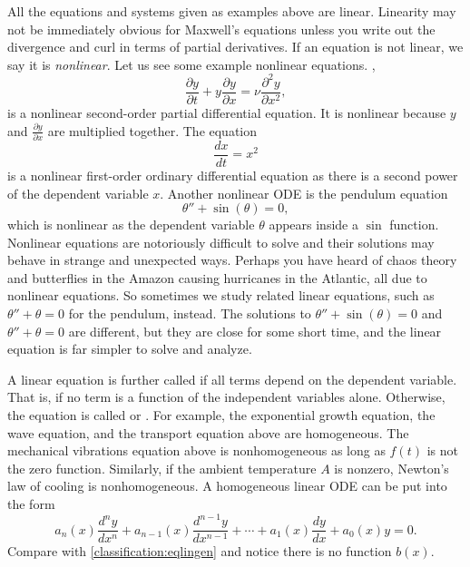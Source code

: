 All the equations and systems given as examples above are linear.
Linearity may not be immediately obvious for Maxwell's equations unless you write out
the divergence and curl in terms of partial derivatives.
If an equation is not linear, we say it is
\emph{nonlinear}.
Let us see some
example nonlinear equations.  ,
\begin{equation*}
\frac{\partial y}{\partial t} +
y \frac{\partial y}{\partial x} =
\nu \frac{\partial^2 y}{\partial x^2} ,
\end{equation*}
is a nonlinear second-order partial differential equation.  It is nonlinear
because $y$ and $\frac{\partial y}{\partial x}$ are multiplied together.
The equation
\begin{equation} \label{classification:eqnonlinode}
\frac{dx}{dt} = x^2
\end{equation}
is a nonlinear first-order ordinary differential equation as there is a second power of
the dependent variable $x$.  Another nonlinear ODE is the pendulum equation
\begin{equation} \label{classification:pendulum}
\theta''+\sin(\theta)=0 ,
\end{equation}
which is nonlinear as the dependent
variable $\theta$ appears inside a $\sin$ function.
Nonlinear equations are notoriously difficult to solve and
their solutions may behave in strange and unexpected ways.
Perhaps you have heard of chaos theory and butterflies
in the Amazon causing hurricanes in the Atlantic, all due to nonlinear
equations.
So sometimes we
study related linear equations, such as $\theta''+\theta=0$ for the pendulum, instead.
The solutions to $\theta''+\sin(\theta) = 0$ and
$\theta''+\theta=0$ are different, but they are
close for some short time, and the linear equation
is far simpler to solve and analyze.

\medskip

A linear equation is further called \emph{} if
all terms depend on the dependent variable.  That is, if no
term is a function of the independent variables alone.  Otherwise, the
equation is called \emph{} or
\emph{}.  For example,
the exponential growth equation, the wave equation, and the transport equation above
are homogeneous. The mechanical vibrations equation above is nonhomogeneous
as long as $f(t)$ is not the zero function.  Similarly, if the ambient temperature $A$ is nonzero,
Newton's law of cooling is nonhomogeneous.
A homogeneous linear ODE can be put into the form
\begin{equation*}
a_n(x) \frac{d^n y}{dx^n} +
a_{n-1}(x) \frac{d^{n-1} y}{dx^{n-1}} +
\cdots
+
a_{1}(x) \frac{dy}{dx}
+
a_{0}(x) y = 0 .
\end{equation*}
Compare with \eqref{classification:eqlingen} and notice there is no
function $b(x)$.

